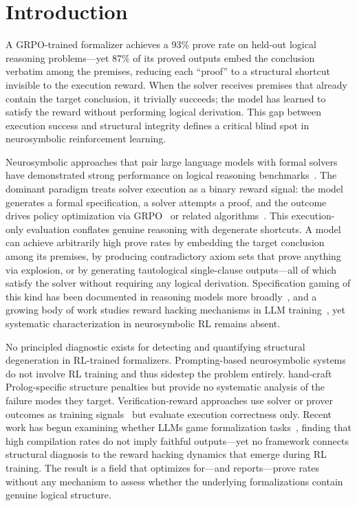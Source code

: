 \section{Introduction}
\label{sec:introduction}

A GRPO-trained formalizer achieves a 93\% prove rate on held-out logical reasoning problems---yet 87\% of its proved outputs embed the conclusion verbatim among the premises, reducing each ``proof'' to a structural shortcut invisible to the execution reward.
When the solver receives premises that already contain the target conclusion, it trivially succeeds; the model has learned to satisfy the reward without performing logical derivation.
This gap between execution success and structural integrity defines a critical blind spot in neurosymbolic reinforcement learning.

Neurosymbolic approaches that pair large language models with formal solvers have demonstrated strong performance on logical reasoning benchmarks~\citep{satlm, logic-lm, linc, fover-pei2025}.
The dominant paradigm treats solver execution as a binary reward signal: the model generates a formal specification, a solver attempts a proof, and the outcome drives policy optimization via GRPO~\citep{deepseekmath} or related algorithms~\citep{deepseek-r1}.
This execution-only evaluation conflates genuine reasoning with degenerate shortcuts.
A model can achieve arbitrarily high prove rates by embedding the target conclusion among its premises, by producing contradictory axiom sets that prove anything via explosion, or by generating tautological single-clause outputs---all of which satisfy the solver without requiring any logical derivation.
Specification gaming of this kind has been documented in reasoning models more broadly~\citep{bondarenko-spec-gaming}, and a growing body of work studies reward hacking mechanisms in LLM training~\citep{reward-hacking-survey}, yet systematic characterization in neurosymbolic RL remains absent.

No principled diagnostic exists for detecting and quantifying structural degeneration in RL-trained formalizers.
Prompting-based neurosymbolic systems~\citep{logic-lm, linc, satlm} do not involve RL training and thus sidestep the problem entirely.
\citet{mellgren-prolog-grpo} hand-craft Prolog-specific structure penalties but provide no systematic analysis of the failure modes they target.
Verification-reward approaches use solver or prover outcomes as training signals~\citep{deepseek-prover-v15, rlsf} but evaluate execution correctness only.
Recent work has begun examining whether LLMs game formalization tasks~\citep{kim-game-formalization}, finding that high compilation rates do not imply faithful outputs---yet no framework connects structural diagnosis to the reward hacking dynamics that emerge during RL training.
The result is a field that optimizes for---and reports---prove rates without any mechanism to assess whether the underlying formalizations contain genuine logical structure.


